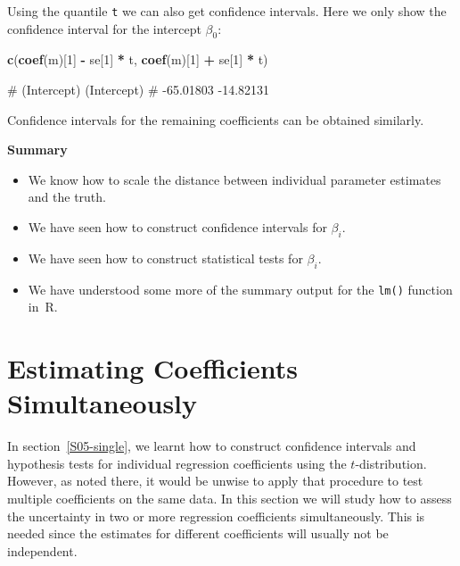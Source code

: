 \documentclass[
  a4paper,
]{article}
\newenvironment{Shaded}{\begin{snugshade}}{\end{snugshade}}
\newcommand{\DecValTok}[1]{\textcolor[rgb]{0.00,0.00,0.81}{#1}}
\newcommand{\FunctionTok}[1]{\textcolor[rgb]{0.13,0.29,0.53}{\textbf{#1}}}
\newcommand{\NormalTok}[1]{#1}
\newcommand{\SpecialCharTok}[1]{\textcolor[rgb]{0.81,0.36,0.00}{\textbf{#1}}}
\providecommand{\tightlist}{%
  \setlength{\itemsep}{0pt}\setlength{\parskip}{0pt}}
\theoremstyle{definition}
\theoremstyle{definition}
\theoremstyle{definition}
\theoremstyle{definition}
\theoremstyle{remark}
\begin{document}
Using the quantile \texttt{t} we can also get confidence intervals. Here we
only show the confidence interval for the intercept \(\beta_0\):

\begin{Shaded}
\begin{Highlighting}[]
\FunctionTok{c}\NormalTok{(}\FunctionTok{coef}\NormalTok{(m)[}\DecValTok{1}\NormalTok{] }\SpecialCharTok{{-}}\NormalTok{ se[}\DecValTok{1}\NormalTok{] }\SpecialCharTok{*}\NormalTok{ t, }\FunctionTok{coef}\NormalTok{(m)[}\DecValTok{1}\NormalTok{] }\SpecialCharTok{+}\NormalTok{ se[}\DecValTok{1}\NormalTok{] }\SpecialCharTok{*}\NormalTok{ t)}
\end{Highlighting}
\end{Shaded}

\begin{Shaded}
\begin{Highlighting}[]
\NormalTok{\# (Intercept) (Intercept) }
\NormalTok{\#   {-}65.01803   {-}14.82131}
\end{Highlighting}
\end{Shaded}

Confidence intervals for the remaining coefficients can be obtained similarly.

\textbf{Summary}

\begin{itemize}
\tightlist
\item
  We know how to scale the distance between individual parameter estimates
  and the truth.
\item
  We have seen how to construct confidence intervals for \(\beta_i\).
\item
  We have seen how to construct statistical tests for \(\beta_i\).
\item
  We have understood some more of the summary output for the \texttt{lm()}
  function in~R.
\end{itemize}

\clearpage

\section{Estimating Coefficients Simultaneously}\label{S06-simultaneous}

In section~\ref{S05-single}, we learnt how to construct confidence intervals
and hypothesis tests for individual regression coefficients using the
\(t\)-distribution. However, as noted there, it would be unwise to apply
that procedure to test multiple coefficients on the same data. In this section
we will study how to assess the uncertainty in two or more
regression coefficients simultaneously. This is needed since the estimates for
different coefficients will usually not be independent.
\end{document}
